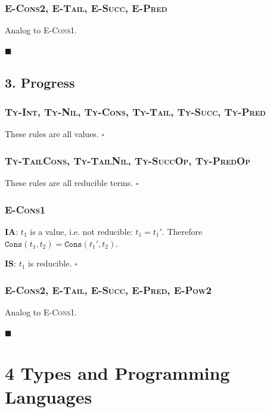 \documentclass[13pt, a4paper]{article}
\begin{document}
\subsubsection*{\textmd{\textsc{E-Cons2}, \textsc{E-Tail}, \textsc{E-Succ}, \textsc{E-Pred}}}
Analog to \textsc{E-Cons1}.

\noindent$\blacksquare$

\subsection*{3. Progress} %

\subsubsection*{\textmd{\textsc{Ty-Int}, \textsc{Ty-Nil}, \textsc{Ty-Cons}, \textsc{Ty-Tail}, \textsc{Ty-Succ}, \textsc{Ty-Pred}}}

These rules are all values. $\square$

\subsubsection*{\textmd{\textsc{Ty-TailCons}, \textsc{Ty-TailNil}, \textsc{Ty-SuccOp}, \textsc{Ty-PredOp}}}

These rules are all reducible terms. $\square$

\subsubsection*{\textmd{\textsc{E-Cons1}}}

\textbf{IA}: $t_1$ is a value, i.e. not reducible: $t_1 =t_1'$. Therefore $\texttt{Cons}(t_1, t_2) = \texttt{Cons}(t_1', t_2)$.

\noindent \textbf{IS}: $t_1$ is reducible. $\square$

\subsubsection*{\textmd{\textsc{E-Cons2}, \textsc{E-Tail}, \textsc{E-Succ}, \textsc{E-Pred}, \textsc{E-Pow2}}}
Analog to \textsc{E-Cons1}.

\noindent$\blacksquare$

\section*{4 Types and Programming Languages}
\end{document}
